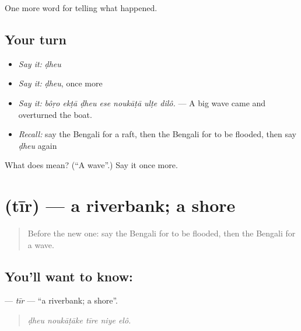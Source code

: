 \begin{grammarlens}[title={What you've built}]
One more word for telling what happened.
\end{grammarlens}

\subsection*{Your turn}
\begin{itemize}
\raggedright
  \item \emph{Say it:} \emph{ḍheu}
  \item \emph{Say it:} \emph{ḍheu}, once more
  \item \emph{Say it:} \emph{bôṛo ekṭā ḍheu ese noukāṭā ulṭe dilô.} — A big wave came and overturned the boat.
  \item \emph{Recall:} say the Bengali for a raft, then the Bengali for to be flooded, then say \emph{ḍheu} again
\end{itemize}

\begin{tcolorbox}[breakable,colback=teal!4,colframe=teal!35!black,title={Before you move on}]
What does  mean? (\textquotedblleft{}A wave\textquotedblright{}.) Say it once more.
\end{tcolorbox}
\section[\texorpdfstring{\bn{তীর} (tīr)}{তীর (tīr)}]{ (tīr) — a riverbank; a shore}

\label{lesson:BN-C290-tir}



\begin{quote}
Before the new one: say the Bengali for to be flooded, then the Bengali for a wave.
\end{quote}

\subsection*{You'll want to know: }
\textbf{} — \emph{tīr} — \textquotedblleft{}a riverbank; a shore\textquotedblright{}.

\begin{quote}
    
\end{quote}

\begin{quote}
\emph{ḍheu noukāṭāke tīre niye elô.}
\end{quote}

